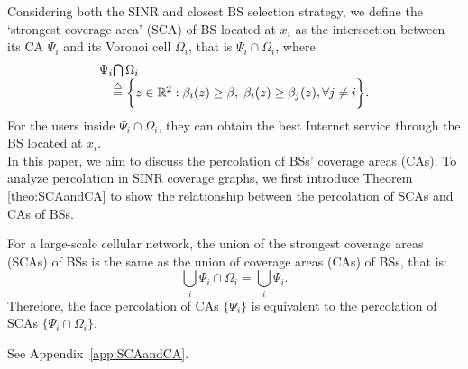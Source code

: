 \documentclass[final]{IEEEtran}
\begin{document}
Considering both the SINR and closest BS selection strategy, we define the `strongest coverage area' (SCA) of BS located at $x_i$ as the intersection between its CA $\Psi_i$ and its Voronoi cell $\Omega_i$, that is $\Psi_i\cap\Omega_i$, where
\begin{equation}
\begin{array}{r@{}l}
\displaystyle\Psi_i&\bigcap\Omega_i\\&\overset{\triangle}{=}\bigg\{z\in\mathbb{R}^2:\beta_i(z)\geq\beta,\;\beta_i(z)\geq\beta_j(z),\forall j\neq i \bigg\}.
\end{array}
\end{equation}
For the users inside $\Psi_i \cap \Omega_i$, they can obtain the best Internet service through the BS located at $x_i$.\\
\indent In this paper, we aim to discuss the percolation of BSs' coverage areas (CAs). To analyze percolation in SINR coverage graphs, we first introduce Theorem \ref{theo:SCAandCA} to show the relationship between the percolation of SCAs and CAs of BSs.
\begin{theorem}
    For a large-scale cellular network, the union of the strongest coverage areas (SCAs) of BSs is the same as the union of coverage areas (CAs) of BSs, that is:
\begin{equation}\label{CASCA}
\bigcup\limits_{i}\Psi_i\cap\Omega_i=\bigcup\limits_{i}\Psi_i.
\end{equation}
Therefore, the face percolation of CAs $\{\Psi_i\}$ is equivalent to the percolation of SCAs $\{\Psi_i\cap\Omega_i\}$.
\label{theo:SCAandCA}
\end{theorem}
\begin{IEEEproof}
    See Appendix~\ref{app:SCAandCA}.
\end{IEEEproof}
\end{document}

